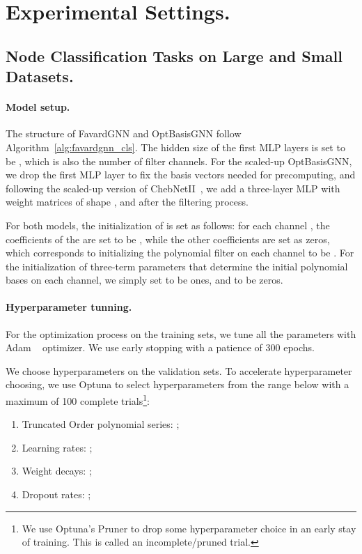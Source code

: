 \section{Experimental Settings.}


\subsection{Node Classification Tasks on Large and Small Datasets.}
\label{expappendix:nodecls}

\paragraph*{Model setup.} The structure of FavardGNN and OptBasisGNN follow Algorithm~\ref{alg:favardgnn_cls}. 
The hidden size of the first MLP layers  is set to be , 
which is also the number of filter channels. 
For the scaled-up OptBasisGNN, 
we drop the first MLP layer to fix the basis vectors needed for precomputing, and following the scaled-up version of ChebNetII~\cite{he2022chebii}, 
we add a three-layer  MLP with weight matrices of shape 
,  and  
after the filtering process.

For both models, the initialization of  is set as follows: for each channel , 
the coefficients of the  are set to be , 
while the other coefficients are set as zeros, 
which corresponds to initializing the polynomial filter 
on each channel to be . 
For the initialization of three-term parameters that determine the initial polynomial bases on each channel, 
we simply set  to be ones, 
and  to be zeros. 

\paragraph*{Hyperparameter tunning.} 
For the optimization process on the training sets, we tune all the parameters with Adam ~\cite{kingma2014adam} optimizer. 
We use early stopping with a patience of 300 epochs.

We choose hyperparameters on the validation sets.
To accelerate hyperparameter choosing, 
we use Optuna\cite{akiba2019optuna} to select hyperparameters from the range below with a maximum of 100 complete trials\footnote{We use Optuna's Pruner to drop some hyperparameter choice in an early stay of training. This is called an incomplete/pruned trial.}:
\begin{enumerate}[topsep=0pt,itemsep=-1ex,partopsep=1ex,parsep=1ex]
    \item Truncated Order polynomial series: ; 
    \item Learning rates: ;
    \item Weight decays: ;
    \item Dropout rates: ; 
\end{enumerate}

